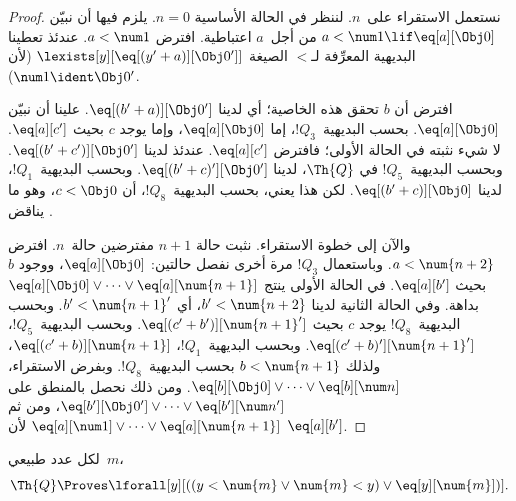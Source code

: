 \documentclass[../../../include/open-logic-section]{subfiles}
\begin{document}
\begin{proof}
نستعمل الاستقراء على~$n$. لننظر في الحالة الأساسية $n=0$. يلزم فيها
أن نبيّن $a<\num 1\lif\eq[a][\Obj 0]$ من أجل~$a$ اعتباطية. افترض
$a<\num 1$. عندئذ تعطينا البديهية المعرِّفة لـ$<$ الصيغة
$\lexists[y][\eq[(y'+a)][\Obj 0']]$ (لأن
$\num 1\ident\Obj 0'$).

افترض أن $b$ تحقق هذه الخاصية؛ أي لدينا
$\eq[(b'+a)][\Obj 0']$. علينا أن نبيّن $\eq[a][\Obj 0]$. بحسب
البديهية~$!Q_3$، إما $\eq[a][\Obj 0]$، وإما يوجد $c$ بحيث
$\eq[a][c']$. لا شيء نثبته في الحالة الأولى؛ فافترض
$\eq[a][c']$. عندئذ لدينا $\eq[(b'+c')][\Obj 0']$. وبحسب
البديهية~$!Q_5$ في $\Th{Q}$، لدينا
$\eq[(b'+c)'][\Obj 0']$. وبحسب البديهية~$!Q_1$، لدينا
$\eq[(b'+c)][\Obj 0]$. لكن هذا يعني، بحسب البديهية~$!Q_8$، أن
$c<\Obj 0$، وهو ما يناقض .

والآن إلى خطوة الاستقراء. نثبت حالة $n+1$ مفترضين حالة~$n$. افترض
$a<\num{n+2}$. وباستعمال $!Q_3$ مرة أخرى نفصل حالتين:
$\eq[a][\Obj 0]$، ووجود $b$ بحيث $\eq[a][b']$. في الحالة الأولى
ينتج
$\eq[a][\Obj 0]\lor\dots\lor\eq[a][\num{n+1}]$ بداهة. وفي
الحالة الثانية لدينا $b'<\num{n+2}$، أي
$b'<\num{n+1}'$. وبحسب البديهية~$!Q_8$ يوجد $c$ بحيث
$\eq[(c'+b')][\num{n+1}']$. وبحسب البديهية~$!Q_5$،
$\eq[(c'+b)'][\num{n+1}']$. وبحسب البديهية~$!Q_1$،
$\eq[(c'+b)][\num{n+1}]$، ولذلك $b<\num{n+1}$ بحسب
البديهية~$!Q_8$. وبفرض الاستقراء،
$\eq[b][\Obj 0]\lor\dots\lor\eq[b][\num n]$. ومن ذلك نحصل
بالمنطق على
$\eq[b'][\Obj 0']\lor\dots\lor\eq[b'][\num n']$، ومن ثم
$\eq[a][\num 1]\lor\dots\lor\eq[a][\num{n+1}]$ لأن
$\eq[a][b']$.
\end{proof}

\begin{lem}
   لكل عدد طبيعي~$m$،
  \[
  \Th{Q} \Proves
  \lforall[y][((y < \num{m} \lor \num{m} < y) \lor \eq[y][\num{m}])].
  \]
\end{lem}
\end{document}
